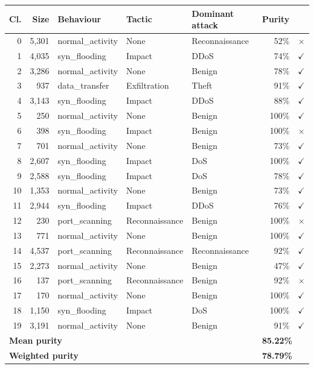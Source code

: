 \begin{tabular}{r r l l l r c}
\toprule
\textbf{Cl.} & \textbf{Size} & \textbf{Behaviour} & \textbf{Tactic} & \textbf{Dominant attack} & \textbf{Purity} & \\
\midrule
0 & 5,301 & normal\_activity & None & Reconnaissance & 52\% & $\times$ \\
1 & 4,035 & syn\_flooding & Impact & DDoS & 74\% & $\checkmark$ \\
2 & 3,286 & normal\_activity & None & Benign & 78\% & $\checkmark$ \\
3 & 937 & data\_transfer & Exfiltration & Theft & 91\% & $\checkmark$ \\
4 & 3,143 & syn\_flooding & Impact & DDoS & 88\% & $\checkmark$ \\
5 & 250 & normal\_activity & None & Benign & 100\% & $\checkmark$ \\
6 & 398 & syn\_flooding & Impact & Benign & 100\% & $\times$ \\
7 & 701 & normal\_activity & None & Benign & 73\% & $\checkmark$ \\
8 & 2,607 & syn\_flooding & Impact & DoS & 100\% & $\checkmark$ \\
9 & 2,588 & syn\_flooding & Impact & DoS & 78\% & $\checkmark$ \\
10 & 1,353 & normal\_activity & None & Benign & 73\% & $\checkmark$ \\
11 & 2,944 & syn\_flooding & Impact & DDoS & 76\% & $\checkmark$ \\
12 & 230 & port\_scanning & Reconnaissance & Benign & 100\% & $\times$ \\
13 & 771 & normal\_activity & None & Benign & 100\% & $\checkmark$ \\
14 & 4,537 & port\_scanning & Reconnaissance & Reconnaissance & 92\% & $\checkmark$ \\
15 & 2,273 & normal\_activity & None & Benign & 47\% & $\checkmark$ \\
16 & 137 & port\_scanning & Reconnaissance & Benign & 92\% & $\times$ \\
17 & 170 & normal\_activity & None & Benign & 100\% & $\checkmark$ \\
18 & 1,150 & syn\_flooding & Impact & DoS & 100\% & $\checkmark$ \\
19 & 3,191 & normal\_activity & None & Benign & 91\% & $\checkmark$ \\
\midrule
\multicolumn{5}{l}{\textbf{Mean purity}} & \multicolumn{2}{l}{\textbf{85.22\%}} \\
\multicolumn{5}{l}{\textbf{Weighted purity}} & \multicolumn{2}{l}{\textbf{78.79\%}} \\
\bottomrule
\end{tabular}
